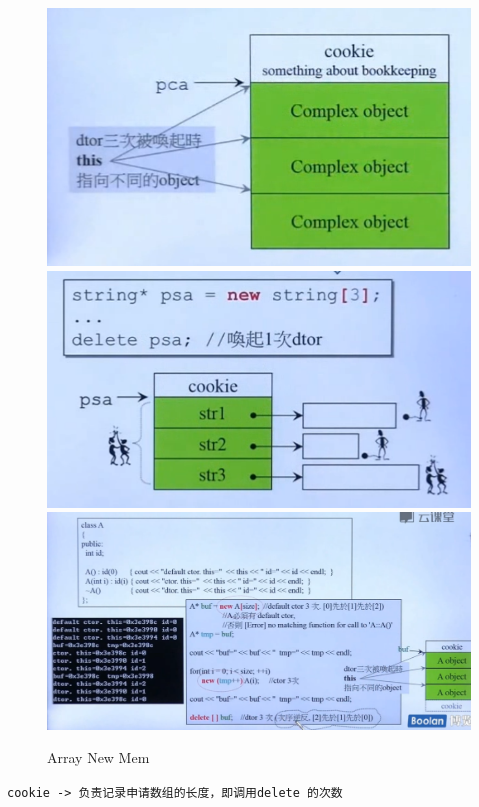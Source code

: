 \documentclass[UTF8,a4paper,12pt]{ctexbook}
\begin{document}
				\begin{figure}[H]
					\centering
					\includegraphics[scale = 0.5]{arrayNew.png}
					\includegraphics[scale = 0.5]{opArrayNew.png}
					\includegraphics[scale = 0.3]{arrayNewExample.png}
					\caption{Array New Mem}
				\end{figure}
				
			\verb|cookie -> 负责记录申请数组的长度，即调用delete 的次数|		
			
\end{document}
